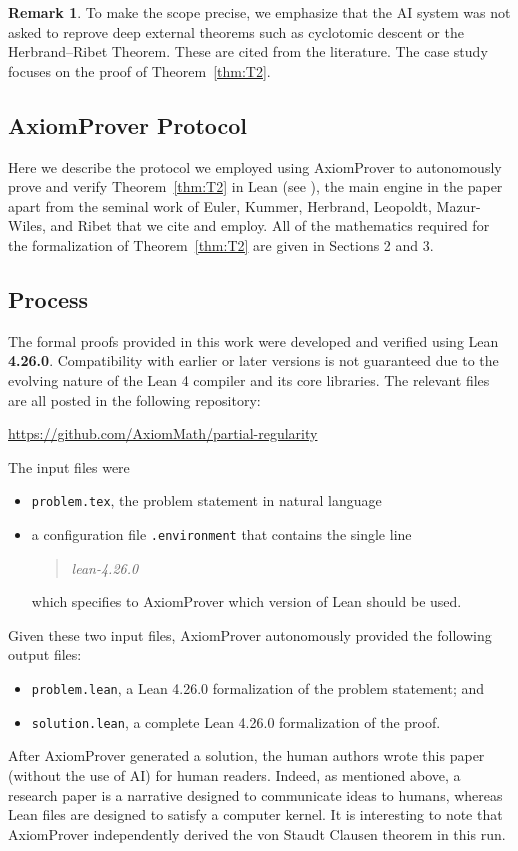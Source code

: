 \documentclass[12pt]{amsart}
\theoremstyle{plain}
\theoremstyle{definition}
\newtheorem{remark}[theorem]{Remark}
\begin{document}
\begin{remark}
To make the scope precise, we emphasize that the AI system was not asked to reprove deep external
theorems such as cyclotomic descent or the Herbrand--Ribet Theorem. These are cited from the literature.
The case study focuses on the proof of Theorem~\ref{thm:T2}.
\end{remark}

\subsection{AxiomProver Protocol}
Here we describe the protocol we employed using AxiomProver to
autonomously prove and verify Theorem~\ref{thm:T2} in Lean (see \cite{Lean, Mathlib2020}),
the main engine in the paper apart from the seminal work of Euler, Kummer, Herbrand, Leopoldt, Mazur-Wiles,
and Ribet that we cite and employ.
All of the mathematics required for the formalization of Theorem~\ref{thm:T2} are given in Sections 2 and 3.

\subsection*{Process}
The formal proofs provided in this work were developed and verified using Lean \textbf{4.26.0}.
Compatibility with earlier or later versions is not guaranteed due to the
evolving nature of the Lean 4 compiler and its core libraries.
The relevant files are all posted in the following repository:
\begin{center}
  \url{https://github.com/AxiomMath/partial-regularity}
\end{center}
The input files were
\begin{itemize}
  \item \texttt{problem.tex}, the problem statement in natural language
  \item a configuration file \texttt{.environment} that contains the single line
  \begin{quote}
    \slshape
    lean-4.26.0
  \end{quote}
  which specifies to AxiomProver which version of Lean should be used.
\end{itemize}
Given these two input files,
AxiomProver autonomously provided the following output files:
\begin{itemize}
  \item \texttt{problem.lean}, a Lean 4.26.0 formalization of the problem statement; and
  \item \texttt{solution.lean}, a complete Lean 4.26.0 formalization of the proof.
\end{itemize}
After AxiomProver generated a solution, the human authors wrote this paper
(without the use of AI) for human readers.
Indeed, as mentioned above, a research paper is a narrative designed to communicate ideas to humans,
whereas  Lean files are designed to satisfy a computer kernel.
It is interesting to note that AxiomProver independently derived the von Staudt Clausen theorem in this run.
\end{document}

